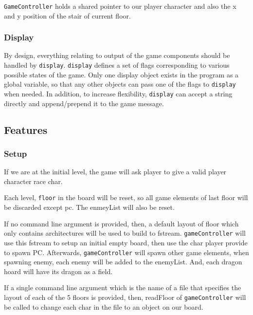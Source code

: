 \documentclass[11pt]{article}
\theoremstyle{plain} \newtheorem{theorem*}{Theorem}[subsection]
\begin{document}
\texttt{GameController} holds a shared pointer to our player character and also
the x and y position of the stair of current floor.

\subsubsection{Display} 

By design, everything relating to output of the game
components should be handled by \texttt{display}. \texttt{display} defines a
set of flags corresponding to various possible states of the game. Only one
display object exists in the program as a global variable, so that any other
objects can pass one of the flags to \texttt{display} when needed.  In
addition, to increase flexibility, \texttt{display} can accept a string
directly and append/prepend it to the game message.\\





\subsection{Features}

\subsubsection{Setup}

If we are at the initial level, the game will ask player to give a valid player
character race char.

Each level, \texttt{floor} in the board will be reset, so all game elements of
last floor will be discarded except pc.
The \textsf{enmeyList} will also be reset.

If no command line argument is provided, then, a default layout of floor which
only contains architectures will be used to build to fstream.
\texttt{gameController} will use this fstream to setup an initial empty board,
then use the char player provide to spawn PC. Afterwards,
\texttt{gameController} will spawn other game elements, when spawning enemy,
each enemy will be added to the \textsf{enemyList}. And, each dragon hoard will
have its dragon as a field.

If a single command line argument which is the name of a file that specifies
the layout of each of the 5 floors is provided, then, \textsf{readFloor} of
\texttt{gameController} will be called to change each char in the file to an
object on our board. 
\end{document}
